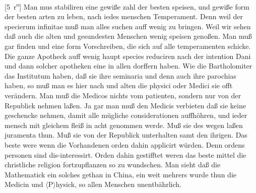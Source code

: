 [5~r\textsuperscript{o}]
\pend%
\pstart%
Man mus stabiliren eine gewi{\ss}e zahl der besten speisen, und gewi{\ss}e form der besten arten zu leben, nach iedes menschen Temperament.\protect{}%
\pend%
\pstart%
Denn
weil der specierum infinitae mu{\ss} man alles suchen auff wenig zu bringen. Weil wir sehen da{\ss} auch die alten und gesundesten Menschen wenig speisen geno{\ss}en.
\pend%
\pstart%
Man mu{\ss} gar
finden und eine form Vorschreiben, die sich auf alle temperamenten\protect{} schicke.
\pend%
\pstart%
Die ganze Apotheck\protect{} auff wenig haupt species reduciren nach der intention Dani
%
und dann solcher apotheken\protect{} eine in allen dorffern haben.
\pend%
\pstart%
Wie die Bartholomiter\protect{} das Institutum haben, da{\ss} sie ihre seminaria und denn auch ihre parochias haben, so mu{\ss} man es hier nach
und alten die physici\protect{} oder Medici\protect{}
sie offt ver\"{a}ndern.
\pend%
\pstart%
Man mu{\ss} die Medicos\protect{} nichts vom patienten\protect{}, sondern nur von der Republick nehmen la{\ss}en.
\pend%
\pstart%
Ja gar man mu{\ss} den Medicis\protect{} verbieten da{\ss} sie keine geschencke nehmen, damit alle m\"{u}gliche considerationen auffh\"{o}hren, und ieder mensch mit gleichem flei{\ss} in acht genommen werde.
\pend%
\pstart%
Mu{\ss} sie des wegen la{\ss}en juramenta thun.
\pend%
\pstart%
Mu{\ss} sie von der Republick unterhalten samt den ihrigen.
\pend%
\pstart%
Das beste were wenn die Vorhandenen orden dahin applicirt w\"{u}rden. Denn ordens personen sind dis-interessirt. Orden dahin gestifftet weren das beste mittel die christliche religion fortzupflanzen so zu wundschen.
\pend%
\pstart%
Man sieht da{\ss} die Mathematick ein solches gethan in China, ein weit mehrers wurde thun die Medicin und $\langle$P$\rangle$hysick, so allen Menschen unentb\"{a}hrlich.%
